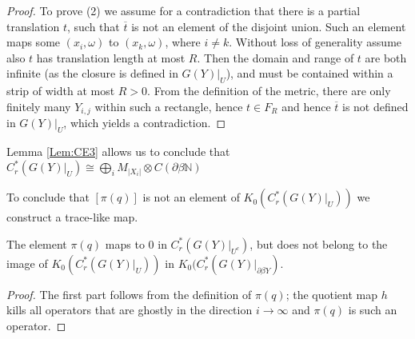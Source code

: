 \begin{example}
\begin{proof}
To prove (2) we assume for a contradiction that there is a partial translation $t$, such that $\overline{t}$ is not an element of the disjoint union. Such an element maps some $(x_{i}, \omega)$ to $(x_{k},\omega)$, where $i\not =k$. Without loss of generality assume also $t$ has translation length at most $R$. Then the domain and range of $t$ are both infinite (as the closure is defined in $G(Y)|_{U}$), and must be contained within a strip of width at most $R>0$. From the definition of the metric, there are only finitely many $Y_{i,j}$ within such a rectangle, hence $t \in F_{R}$ and hence $\overline{t}$ is not defined in $G(Y)|_{U}$, which yields a contradiction.
\end{proof}

\begin{remark}
Lemma \ref{Lem:CE3} allows us to conclude that $C^{*}_{r}(G(Y)|_{U}) \cong \bigoplus_{i}M_{\vert X_{i}\vert} \otimes C(\partial\beta \mathbb{N})$
\end{remark}

To conclude that $[\pi(q)]$ is not an element of $K_{0}(C^{*}_{r}(G(Y)|_{U}))$ we construct a trace-like map.

\begin{theorem}
The element $\pi(q)$ maps to $0$ in $C^{*}_{r}(G(Y)|_{U^{c}})$, but does not belong to the image of  $K_{0}( C^{*}_{r}(G(Y)|_{U}))$ in $K_{0}(C^{*}_{r}(G(Y)|_{\partial\beta Y})$.
\end{theorem}
\begin{proof}
The first part follows from the definition of $\pi(q)$; the quotient map $h$ kills all operators that are ghostly in the direction $i \rightarrow \infty$ and $\pi(q)$ is such an operator.


\end{proof}
\end{example}
